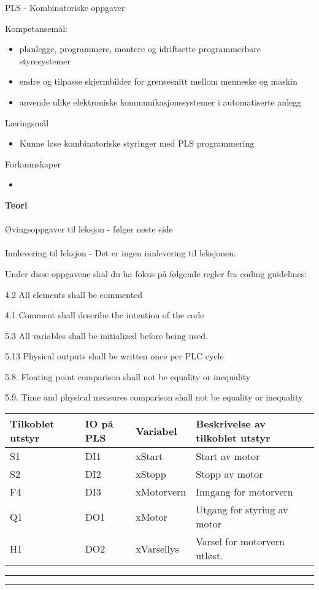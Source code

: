 \centerline{PLS - Kombinatoriske oppgaver}  \bigskip

Kompetansemål:
\begin{itemize}[noitemsep]

	\item planlegge, programmere, montere og idriftsette programmerbare styresystemer
	\item endre og tilpasse skjermbilder for grensesnitt mellom menneske og maskin
	\item anvende ulike elektroniske kommunikasjonssystemer i automatiserte anlegg
\end{itemize}
	Læringsmål
	\begin{itemize}[noitemsep]
		\item Kunne løse kombinatoriske styringer med PLS programmering
	\end{itemize}

	Forkunnskaper

	\begin{itemize}[noitemsep]
		\item 

	\end{itemize}
\textbf{Teori}\\\\
Øvingsoppgaver til leksjon - følger neste side\\\\
Innlevering til leksjon - Det er ingen innlevering til leksjonen. 


Under disse oppgavene skal du ha fokus på følgende regler fra coding
guidelines:

4.2 All elements shall be commented

4.1 Comment shall describe the intention of the code

5.3 All variables shall be initialized before being used. 

5.13 Physical outputs shall be written once per PLC cycle

5.8. Floating point comparison shall not be equality or inequality

5.9. Time and physical measures comparison shall not be equality or
inequality

\begin{tabular}{|l|l|l|l|}
\hline 
Tilkoblet utstyr & IO på PLS & Variabel & Beskrivelse av tilkoblet utstyr\tabularnewline
\hline 
\hline 
S1 & DI1 & xStart & Start av motor\tabularnewline
\hline 
S2 & DI2 & xStopp & Stopp av motor\tabularnewline
\hline 
F4 & DI3 & xMotorvern & Inngang for motorvern\tabularnewline
\hline 
Q1 & DO1 & xMotor & Utgang for styring av motor\tabularnewline
\hline 
H1 & DO2 & xVarsellys & Varsel for motorvern utløst. \tabularnewline
\hline 
\end{tabular}
\bigskip 
\hrule
\vfil \eject

\bigskip 
 
\hrule

\vfil \eject

